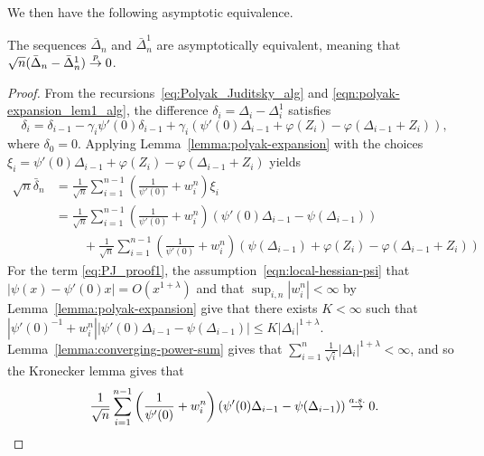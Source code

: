 We then have the following asymptotic equivalence.
\begin{lemma}
  The sequences $\bar{\Delta}_n$ and $\bar{\Delta}^1_n$ are asymptotically
  equivalent, meaning that
  $\sqrt{n} (\bar{\Delta}_n - \bar{\Delta}_n^1) \stackrel{p}{\rightarrow} 0$.
\end{lemma}
\begin{proof}
  From the recursions~\eqref{eq:Polyak_Juditsky_alg} and
  \eqref{eqn:polyak-expansion_lem1_alg}, the difference $\delta_i = \Delta_i
  - \Delta_i^1$ satisfies
  \begin{equation*}
  \delta_i = \delta_{i-1} - \gamma_i \psi'(0) \delta_{i-1} + \gamma_i \left( \psi'(0) \Delta_{i-1}  + \varphi(Z_i) - \varphi(\Delta_{i-1} + Z_i) \right),
  \end{equation*}
  where $\delta_0 = 0$. Applying Lemma~\ref{lemma:polyak-expansion} with the
  choices $\xi_i = \psi'(0) \Delta_{i-1} + \varphi(Z_i) -
  \varphi(\Delta_{i-1} + Z_i)$ yields
  \begin{align}
    \sqrt{n}\bar{\delta}_n
    & = \frac{1}{\sqrt{n}} \sum_{i=1}^{n-1}
    \left( \frac{1}{\psi'(0)} + w_i^n \right)  \xi_i  \nonumber \\
    & = \frac{1}{\sqrt{n}} \sum_{i=1}^{n-1}
    \left( \frac{1}{\psi'(0)} + w_i^n \right)
    \left( \psi'(0) \Delta_{i-1}  - \psi(\Delta_{i-1}) \right)
    \label{eq:PJ_proof1} \\
    & \qquad ~ + 
    \frac{1}{\sqrt{n}} \sum_{i=1}^{n-1} \left( \frac{1}{\psi'(0)}
    + w_i^n \right)
    \left( \psi(\Delta_{i-1})  + \varphi(Z_i) - \varphi(\Delta_{i-1}+Z_i)
    \right) \label{eq:PJ_proof2}
  \end{align}
  For the term \eqref{eq:PJ_proof1},
  the assumption~\eqref{eqn:local-hessian-psi} that
  $|\psi(x) - \psi'(0) x| = O(x^{1 + \lambda})$
  and that $\sup_{i,n} |w_i^n| < \infty$ by Lemma~\ref{lemma:polyak-expansion}
  give that there exists $K < \infty$ such that
  $|\psi'(0)^{-1} + w_i^n| |\psi'(0) \Delta_{i-1} - \psi(\Delta_{i-1})|
  \le K |\Delta_i|^{1 + \lambda}$.
  Lemma~\ref{lemma:converging-power-sum} gives that
  $\sum_{i = 1}^n
  \frac{1}{\sqrt{i}} |\Delta_i|^{1 + \lambda} < \infty$,
  and so the Kronecker lemma gives that
  \begin{equation*}
    \frac{1}{\sqrt{n}} \sum_{i=1}^{n-1} \left( \frac{1}{\psi'(0)}  + w_i^n \right)  \left( \psi'(0) \Delta_{i-1}  - \psi(\Delta_{i-1}) \right) \stackrel{a.s.}{\rightarrow} 0.
  \end{equation*}


\end{proof}
